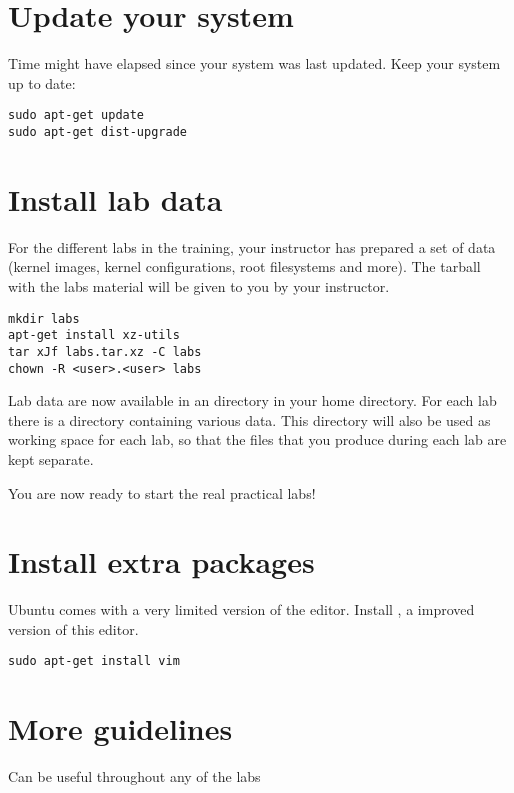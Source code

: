 
\section{Update your system}

Time might have elapsed since your system was last updated. Keep your
system up to date:

\begin{verbatim}
sudo apt-get update
sudo apt-get dist-upgrade
\end{verbatim}

\section{Install lab data}
For the different labs in the training, your instructor has prepared a
set of data (kernel images, kernel configurations, root filesystems
and more). The tarball with the labs material will be given to you by
your instructor.

\begin{verbatim}
mkdir labs
apt-get install xz-utils
tar xJf labs.tar.xz -C labs
chown -R <user>.<user> labs
\end{verbatim}

Lab data are now available in an  directory in your home
directory. For each lab there is a directory containing various
data. This directory will also be used as working space for each lab,
so that the files that you produce during each lab are kept separate.

You are now ready to start the real practical labs!

\section{Install extra packages}

Ubuntu comes with a very limited version of the 
editor. Install , a improved version of this editor.

\begin{verbatim}
sudo apt-get install vim
\end{verbatim}

\section{More guidelines}

Can be useful throughout any of the labs

